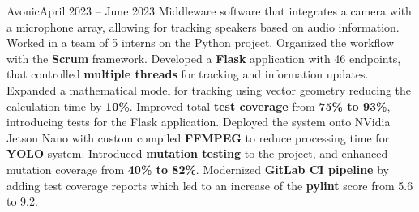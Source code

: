     {Avonic}{April 2023 -- June 2023}
    \vspace{6pt}
    \scriptsize { \small{\newline{} Middleware software that integrates a camera with a microphone array, allowing for tracking speakers based on audio information.}}
    \vspace{-4pt}
    \resumeItemListStart
        \subItemOfItem
            {Worked in a team of 5 interns on the Python project. Organized the workflow with the \textbf{Scrum} framework.}
         \subItemOfItem
            {Developed a \textbf{Flask} application with 46 endpoints, that controlled \textbf{multiple threads} for tracking and information updates.}
        \subItemOfItem
            {Expanded a mathematical model for tracking using vector geometry reducing the calculation time by \textbf{10\%}.}
        \subItemOfItem
            {Improved total \textbf{test coverage} from \textbf{75\% to 93\%}, introducing tests for the Flask application.}
        \subItemOfItem
            {Deployed the system onto NVidia Jetson Nano with custom compiled \textbf{FFMPEG} to reduce processing time for \textbf{YOLO} system.}
        \subItemOfItem
            {Introduced \textbf{mutation testing} to the project, and enhanced mutation coverage from \textbf{40\% to 82\%}.}
        \subItemOfItem
            {Modernized \textbf{GitLab CI pipeline} by adding test coverage reports which led to an increase of the \textbf{pylint} score from 5.6 to 9.2.}
      \resumeItemListEnd